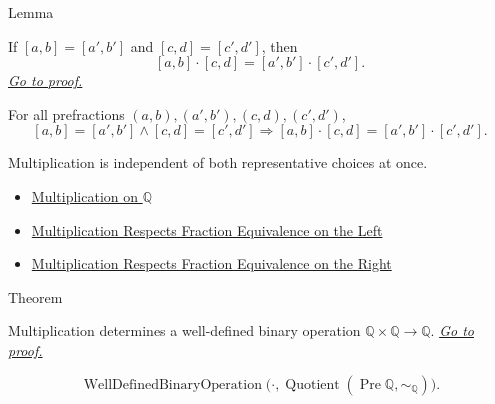 \begin{lemmabox}{Lemma}
\begin{lemma}
\label{lem:multiplication-on-q-respects-equivalence}
If $[a,b]=[a',b']$ and $[c,d]=[c',d']$, then
\[
[a,b]\cdot[c,d]=[a',b']\cdot[c',d'].
\]
\hyperref[prf:multiplication-on-q-respects-equivalence]{\textit{Go to proof.}}
\end{lemma}
\end{lemmabox}

\begin{remark*}
For all prefractions $(a,b),(a',b'),(c,d),(c',d')$,
\[
[a,b]=[a',b']\land [c,d]=[c',d']
\Longrightarrow
[a,b]\cdot[c,d]=[a',b']\cdot[c',d'].
\]
\end{remark*}

\begin{remark*}[Interpretation]
Multiplication is independent of both representative choices at once.
\end{remark*}

\begin{dependencies}
\begin{itemize}
  \item \hyperref[def:multiplication-on-q-classes]{Multiplication on $\mathbb{Q}$}
  \item \hyperref[lem:multiplication-on-q-respects-left-equivalence]{Multiplication Respects Fraction Equivalence on the Left}
  \item \hyperref[lem:multiplication-on-q-respects-right-equivalence]{Multiplication Respects Fraction Equivalence on the Right}
\end{itemize}
\end{dependencies}

\begin{theorembox}{Theorem}
\begin{theorem}
\label{thm:multiplication-on-q-well-defined}
Multiplication determines a well-defined binary operation
$\mathbb{Q}\times\mathbb{Q}\to\mathbb
{Q}$.
\hyperref[prf:multiplication-on-q-well-defined]{\textit{Go to proof.}}
\end{theorem}
\end{theorembox}

\begin{remark*}
\[
\operatorname{WellDefinedBinaryOperation}
\bigl(\cdot,\operatorname{Quotient}(\operatorname{Pre}\mathbb{Q},\sim_{\mathbb{Q}})\bigr).
\]
\end{remark*}

